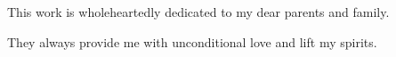 This work is wholeheartedly dedicated to my dear parents and family.

They always provide me with unconditional love and lift my spirits.
